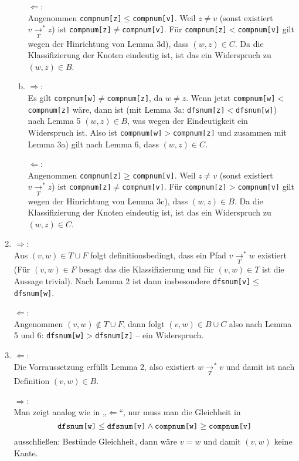 \documentclass[a4paper]{scrartcl}
\newcommand{\pfad}[1][]{\underset{#1}{\longrightarrow}^*}
\begin{document}
\begin{enumerate}
\begin{enumerate}[(a)]
$\Longleftarrow$:\\
Angenommen \verb|compnum[z]|$\le$\verb|compnum[v]|. 
Weil $z\neq v$ (sonst existiert $v\pfad[T] z$) ist \verb|compnum[z]|$\neq$\verb|compnum[v]|.
Für \verb|compnum[z]|$<$\verb|compnum[v]| gilt wegen der Hinrichtung von Lemma 3d), dass $(w,z)\in C$.
Da die Klassifizierung der Knoten eindeutig ist, ist das ein Widerspruch zu $(w,z)\in B$.

\item

$\Longrightarrow$:\\
Es gilt \verb|compnum[w]|$\neq$\verb|compnum[z]|, da $w\neq z$.
Wenn jetzt \verb|compnum[w]|$<$\verb|compnum[z]| wäre, dann ist (mit Lemma 3a: \verb|dfsnum[z]|$<$\verb|dfsnum[w]|) nach Lemma 5 $(w,z)\in B$, was wegen der Eindeutigkeit ein Widerspruch ist.
Also ist \verb|compnum[w]|$>$\verb|compnum[z]| und zusammen mit Lemma 3a) gilt nach Lemma 6, dass $(w,z)\in C$.

$\Longleftarrow$:\\
Angenommen \verb|compnum[z]|$\ge$\verb|compnum[v]|. 
Weil $z\neq v$ (sonst existiert $v\pfad[T] z$) ist \verb|compnum[z]|$\neq$\verb|compnum[v]|.
Für \verb|compnum[z]|$>$\verb|compnum[v]| gilt wegen der Hinrichtung von Lemma 3c), dass $(w,z)\in B$.
Da die Klassifizierung der Knoten eindeutig ist, ist das ein Widerspruch zu $(w,z)\in C$.

\end{enumerate}

\item
$\Longrightarrow$:\\
Aus $(v,w) \in T\cup F$ folgt definitionsbedingt, dass ein Pfad $v\pfad[T]w$ existiert (Für $(v,w)\in F$ besagt das die Klassifizierung und für $(v,w)\in T$ ist die Aussage trivial).
Nach Lemma 2 ist dann insbesondere \verb|dfsnum[v]|$\le$\verb|dfsnum[w]|.

$\Longleftarrow$:\\
Angenommen $(v,w)\not\in T\cup F$, dann folgt $(v,w)\in B\cup C$ also nach Lemma 5 und 6: \verb|dfsnum[w]|$>$\verb|dfsnum[z]| – ein Widerspruch.

\item
$\Longleftarrow$:\\
Die Vorraussetzung erfüllt Lemma 2, also existiert $w\pfad[T]v$ und damit ist nach Definition $(v,w)\in B$.

$\Longrightarrow$:\\
Man zeigt analog wie in „$\Longleftarrow$“, nur muss man die Gleichheit in
\[
\verb|dfsnum[w]|\le\verb|dfsnum[v]| \land \verb|compnum[w]| \ge \verb|compnum[v]|
\]
ausschließen:
Bestünde Gleichheit, dann wäre $v=w$ und damit $(v,w)$ keine Kante.


\end{enumerate}
\end{document}

